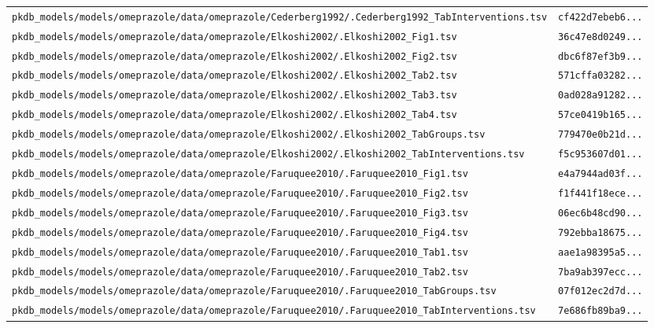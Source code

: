 \begin{longtable}{ll}
\texttt{pkdb\_models/models/omeprazole/data/omeprazole/Cederberg1992/.Cederberg1992\_TabInterventions.tsv} & \texttt{cf422d7ebeb6...} \\
\texttt{pkdb\_models/models/omeprazole/data/omeprazole/Elkoshi2002/.Elkoshi2002\_Fig1.tsv} & \texttt{36c47e8d0249...} \\
\texttt{pkdb\_models/models/omeprazole/data/omeprazole/Elkoshi2002/.Elkoshi2002\_Fig2.tsv} & \texttt{dbc6f87ef3b9...} \\
\texttt{pkdb\_models/models/omeprazole/data/omeprazole/Elkoshi2002/.Elkoshi2002\_Tab2.tsv} & \texttt{571cffa03282...} \\
\texttt{pkdb\_models/models/omeprazole/data/omeprazole/Elkoshi2002/.Elkoshi2002\_Tab3.tsv} & \texttt{0ad028a91282...} \\
\texttt{pkdb\_models/models/omeprazole/data/omeprazole/Elkoshi2002/.Elkoshi2002\_Tab4.tsv} & \texttt{57ce0419b165...} \\
\texttt{pkdb\_models/models/omeprazole/data/omeprazole/Elkoshi2002/.Elkoshi2002\_TabGroups.tsv} & \texttt{779470e0b21d...} \\
\texttt{pkdb\_models/models/omeprazole/data/omeprazole/Elkoshi2002/.Elkoshi2002\_TabInterventions.tsv} & \texttt{f5c953607d01...} \\
\texttt{pkdb\_models/models/omeprazole/data/omeprazole/Faruquee2010/.Faruquee2010\_Fig1.tsv} & \texttt{e4a7944ad03f...} \\
\texttt{pkdb\_models/models/omeprazole/data/omeprazole/Faruquee2010/.Faruquee2010\_Fig2.tsv} & \texttt{f1f441f18ece...} \\
\texttt{pkdb\_models/models/omeprazole/data/omeprazole/Faruquee2010/.Faruquee2010\_Fig3.tsv} & \texttt{06ec6b48cd90...} \\
\texttt{pkdb\_models/models/omeprazole/data/omeprazole/Faruquee2010/.Faruquee2010\_Fig4.tsv} & \texttt{792ebba18675...} \\
\texttt{pkdb\_models/models/omeprazole/data/omeprazole/Faruquee2010/.Faruquee2010\_Tab1.tsv} & \texttt{aae1a98395a5...} \\
\texttt{pkdb\_models/models/omeprazole/data/omeprazole/Faruquee2010/.Faruquee2010\_Tab2.tsv} & \texttt{7ba9ab397ecc...} \\
\texttt{pkdb\_models/models/omeprazole/data/omeprazole/Faruquee2010/.Faruquee2010\_TabGroups.tsv} & \texttt{07f012ec2d7d...} \\
\texttt{pkdb\_models/models/omeprazole/data/omeprazole/Faruquee2010/.Faruquee2010\_TabInterventions.tsv} & \texttt{7e686fb89ba9...} \\

\end{longtable}
